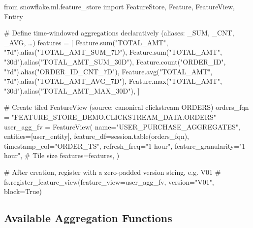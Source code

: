 \documentclass[
  letterpaper,
  DIV=11,
  numbers=noendperiod]{scrreprt}
\newenvironment{Shaded}{\begin{snugshade}}{\end{snugshade}}
\newcommand{\BuiltInTok}[1]{\textcolor[rgb]{0.00,0.23,0.31}{#1}}
\newcommand{\CommentTok}[1]{\textcolor[rgb]{0.37,0.37,0.37}{#1}}
\newcommand{\ImportTok}[1]{\textcolor[rgb]{0.00,0.46,0.62}{#1}}
\newcommand{\NormalTok}[1]{\textcolor[rgb]{0.00,0.23,0.31}{#1}}
\newcommand{\OperatorTok}[1]{\textcolor[rgb]{0.37,0.37,0.37}{#1}}
\newcommand{\StringTok}[1]{\textcolor[rgb]{0.13,0.47,0.30}{#1}}
\begin{document}
\begin{Shaded}
\begin{Highlighting}[]
\ImportTok{from}\NormalTok{ snowflake.ml.feature\_store }\ImportTok{import}\NormalTok{ FeatureStore, Feature, FeatureView, Entity}

\CommentTok{\# Define time{-}windowed aggregations declaratively (aliases: \_SUM, \_CNT, \_AVG, …)}
\NormalTok{features }\OperatorTok{=}\NormalTok{ [}
\NormalTok{    Feature.}\BuiltInTok{sum}\NormalTok{(}\StringTok{"TOTAL\_AMT"}\NormalTok{, }\StringTok{"7d"}\NormalTok{).alias(}\StringTok{"TOTAL\_AMT\_SUM\_7D"}\NormalTok{),}
\NormalTok{    Feature.}\BuiltInTok{sum}\NormalTok{(}\StringTok{"TOTAL\_AMT"}\NormalTok{, }\StringTok{"30d"}\NormalTok{).alias(}\StringTok{"TOTAL\_AMT\_SUM\_30D"}\NormalTok{),}
\NormalTok{    Feature.count(}\StringTok{"ORDER\_ID"}\NormalTok{, }\StringTok{"7d"}\NormalTok{).alias(}\StringTok{"ORDER\_ID\_CNT\_7D"}\NormalTok{),}
\NormalTok{    Feature.avg(}\StringTok{"TOTAL\_AMT"}\NormalTok{, }\StringTok{"7d"}\NormalTok{).alias(}\StringTok{"TOTAL\_AMT\_AVG\_7D"}\NormalTok{),}
\NormalTok{    Feature.}\BuiltInTok{max}\NormalTok{(}\StringTok{"TOTAL\_AMT"}\NormalTok{, }\StringTok{"30d"}\NormalTok{).alias(}\StringTok{"TOTAL\_AMT\_MAX\_30D"}\NormalTok{),}
\NormalTok{]}

\CommentTok{\# Create tiled FeatureView (source: canonical clickstream ORDERS)}
\NormalTok{orders\_fqn }\OperatorTok{=} \StringTok{"FEATURE\_STORE\_DEMO.CLICKSTREAM\_DATA.ORDERS"}
\NormalTok{user\_agg\_fv }\OperatorTok{=}\NormalTok{ FeatureView(}
\NormalTok{    name}\OperatorTok{=}\StringTok{"USER\_PURCHASE\_AGGREGATES"}\NormalTok{,}
\NormalTok{    entities}\OperatorTok{=}\NormalTok{[user\_entity],}
\NormalTok{    feature\_df}\OperatorTok{=}\NormalTok{session.table(orders\_fqn),}
\NormalTok{    timestamp\_col}\OperatorTok{=}\StringTok{"ORDER\_TS"}\NormalTok{,}
\NormalTok{    refresh\_freq}\OperatorTok{=}\StringTok{"1 hour"}\NormalTok{,}
\NormalTok{    feature\_granularity}\OperatorTok{=}\StringTok{"1 hour"}\NormalTok{,  }\CommentTok{\# Tile size}
\NormalTok{    features}\OperatorTok{=}\NormalTok{features,}
\NormalTok{)}

\CommentTok{\# After creation, register with a zero{-}padded version string, e.g. V01}
\CommentTok{\# fs.register\_feature\_view(feature\_view=user\_agg\_fv, version="V01", block=True)}
\end{Highlighting}
\end{Shaded}

\hypertarget{available-aggregation-functions-1}{%
\subsection{Available Aggregation
Functions}\label{available-aggregation-functions-1}}
\end{document}
